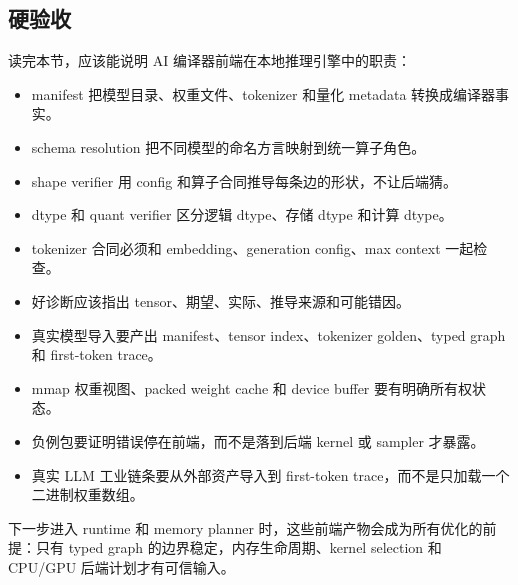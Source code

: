 \subsection{硬验收}

读完本节，应该能说明 AI 编译器前端在本地推理引擎中的职责：

\begin{itemize}
  \item manifest 把模型目录、权重文件、tokenizer 和量化 metadata 转换成编译器事实。
  \item schema resolution 把不同模型的命名方言映射到统一算子角色。
  \item shape verifier 用 config 和算子合同推导每条边的形状，不让后端猜。
  \item dtype 和 quant verifier 区分逻辑 dtype、存储 dtype 和计算 dtype。
  \item tokenizer 合同必须和 embedding、generation config、max context 一起检查。
  \item 好诊断应该指出 tensor、期望、实际、推导来源和可能错因。
  \item 真实模型导入要产出 manifest、tensor index、tokenizer golden、typed graph 和 first-token trace。
  \item mmap 权重视图、packed weight cache 和 device buffer 要有明确所有权状态。
  \item 负例包要证明错误停在前端，而不是落到后端 kernel 或 sampler 才暴露。
  \item 真实 LLM 工业链条要从外部资产导入到 first-token trace，而不是只加载一个二进制权重数组。
\end{itemize}

下一步进入 runtime 和 memory planner 时，这些前端产物会成为所有优化的前提：只有 typed graph 的边界稳定，内存生命周期、kernel selection 和 CPU/GPU 后端计划才有可信输入。
